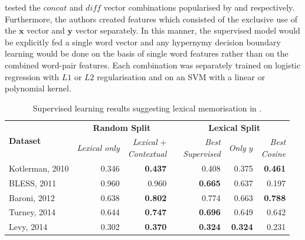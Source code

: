 \citeauthor{levy2015supervised} tested the $concat$ and $diff$ vector combinations popularised by \citep{baroni2012entailment} and \citep{roller2014inclusive} respectively.  Furthermore, the authors created features which consisted of the exclusive use of the $\bm{x}$ vector and $\bm{y}$ vector separately.  In this manner, the supervised model would be explicitly fed a single word vector and any hypernymy decision boundary learning would be done on the basis of single word features rather than on the combined word-pair features.  Each combination was separately trained on logistic regression with $L1$ or $L2$ regularisation and on an \ac{SVM} with a linear or polynomial kernel.
\begin{table}\centering
    \begin{tabular}{@{}lrrcrrr@{}} \toprule
    \multirow{2}{*}{\textbf{Dataset}} & \multicolumn{2}{c}{\textbf{Random Split}} & \phantom{ab} & \multicolumn{3}{c}{\textbf{Lexical Split}} \\ 
    \cmidrule{2-3} \cmidrule{5-7} 
    & \textit{Lexical only} & \shortstack[r]{\textit{Lexical} +\\\textit{Contextual}} && \shortstack[r]{\textit{Best}\\\textit{Supervised}} & \textit{Only $y$} & \shortstack[r]{\textit{Best}\\\textit{Cosine}} \\ \midrule
    Kotlerman, 2010 & 0.346 & \textbf{0.437} && 0.408 & 0.375 & \textbf{0.461} \\
    BLESS, 2011 & 0.960 & 0.960 && \textbf{0.665} & 0.637 & 0.197 \\
    Baroni, 2012 & 0.638 & \textbf{0.802}  && 0.774 & 0.663 & \textbf{0.788} \\
    Turney, 2014 & 0.644 & \textbf{0.747} && \textbf{0.696} & 0.649 & 0.642 \\
    Levy, 2014 & 0.302 & \textbf{0.370} && \textbf{0.324} & \textbf{0.324} & 0.231 \\
    \bottomrule
    \end{tabular}
    \caption{Supervised learning results suggesting lexical memorisation in \citep{levy2015supervised}.}\label{tab:levy_lexical_memo}
\end{table}

